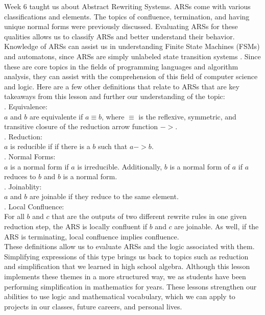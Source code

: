 \documentclass{article}
\theoremstyle{theorem}
\theoremstyle{definition}
\theoremstyle{remark}
\begin{document}
Week 6 taught us about Abstract Rewriting Systems. ARSs come with various classifications and elements. The topics of confluence, termination, and having unique normal forms were previously discussed. Evaluating ARSs for these qualities allows us to classify ARSs and better understand their behavior. Knowledge of ARSs can assist us in understanding Finite State Machines (FSMs) and automatons, since ARSs are simply unlabeled state transition systems \cite{Ars}. Since these are core topics in the fields of programming languages and algorithm analysis, they can assist with the comprehension of this field of computer science and logic. Here are a few other definitions that relate to ARSs that are key takeaways from this lesson and further our understanding of the topic:
\\. Equivalence:
\\\indent $a$ and $b$ are equivalente if $a \equiv b$, where $\equiv$ is the reflexive, symmetric, and transitive closure of the reduction arrow function $->$.
\\. Reduction:
\\\indent $a$ is reducible if if there is a $b$ such that $a -> b$.
\\. Normal Forms:
\\\indent $a$ is a normal form if $a$ is irreducible. Additionally, $b$ is a normal form of $a$ if $a$ reduces to $b$ and $b$ is a normal form. 
\\. Joinablity:
\\\indent $a$ and $b$ are joinable if they reduce to the same element.
\\. Local Confluence:
\\\indent For all $b$ and $c$ that are the outputs of two different rewrite rules in one given reduction step, the ARS is locally confluent if $b$ and $c$ are joinable. As well, if the ARS is terminating, local confluence implies confluence. 
\\\indent These definitions allow us to evaluate ARSs and the logic associated with them. Simplifying expressions of this type brings us back to topics such as reduction and simplification that we learned in high school algebra. Although this lesson implements these themes in a more structured way, we as students have been performing simplification in mathematics for years. These lessons strengthen our abilities to use logic and mathematical vocabulary, which we can apply to projects in our classes, future careers, and personal lives. 
\end{document}
